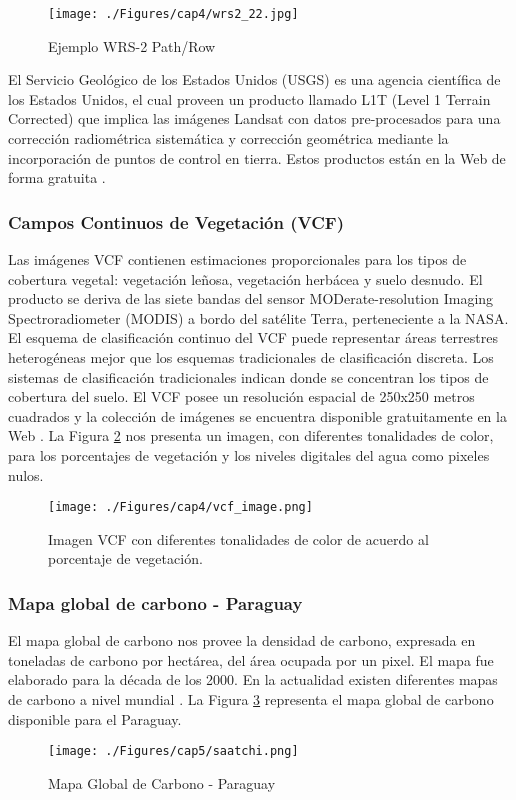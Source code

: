 \begin{figure}[H]
	\centering
	\texttt{[image: ./Figures/cap4/wrs2\_22.jpg]}
	\caption{Ejemplo WRS-2 Path/Row}
	\label{fig:wrs2Image}
\end{figure}

El Servicio Geol\'ogico de los Estados Unidos (USGS) es una agencia cient\'ifica de los Estados Unidos, el cual proveen un producto llamado L1T (Level 1 Terrain Corrected) que implica las im\'agenes Landsat con datos pre-procesados para una correcci\'on radiom\'etrica sistem\'atica y correcci\'on geom\'etrica mediante la incorporaci\'on de puntos de control en tierra. Estos productos est\'an en la Web de forma gratuita \cite{landsatNasa}.


\subsubsection{Campos Continuos de Vegetación (VCF)}\label{sec:vcf}
Las im\'agenes VCF contienen estimaciones proporcionales para los tipos de cobertura vegetal: vegetaci\'on le\~{n}osa, vegetaci\'on herb\'acea y suelo desnudo. El producto se deriva de las siete bandas del sensor MODerate-resolution Imaging Spectroradiometer (MODIS) a bordo del sat\'elite Terra, perteneciente a la NASA. El esquema de clasificaci\'on continuo del VCF puede representar \'areas terrestres heterog\'eneas mejor que los esquemas tradicionales de clasificaci\'on discreta. Los sistemas de clasificaci\'on tradicionales indican donde se concentran los tipos de cobertura del suelo. El VCF posee un resoluci\'on espacial de 250x250 metros cuadrados y la colecci\'on de im\'agenes se encuentra disponible gratuitamente en la Web \cite{gl2015Uni}.
La Figura \ref{fig:vcfImage} nos presenta un imagen, con diferentes tonalidades de color, para los porcentajes de vegetaci\'on y los niveles digitales del agua como pixeles nulos.
\begin{figure}[H]
	\centering
	\texttt{[image: ./Figures/cap4/vcf\_image.png]}
	\caption{Imagen VCF con diferentes tonalidades de color de acuerdo al porcentaje de vegetaci\'on.}
	\label{fig:vcfImage}
\end{figure}
\subsubsection{Mapa global de carbono - Paraguay}\label{sec:saatchiMapa}
El mapa global de carbono \cite{saatchi2011benchmark} nos provee la densidad de carbono, expresada en toneladas de carbono por hect\'area, del \'area ocupada por un pixel. El mapa fue elaborado para la d\'ecada de los 2000. En la actualidad existen diferentes mapas de carbono a nivel mundial \cite{saatchi2011benchmark}. La Figura \ref{fig:saatchi} representa el mapa global de carbono disponible para el Paraguay.
\begin{figure}[H]
	\centering
	\texttt{[image: ./Figures/cap5/saatchi.png]}
	\caption{Mapa Global de Carbono - Paraguay}
	\label{fig:saatchi}
\end{figure}


